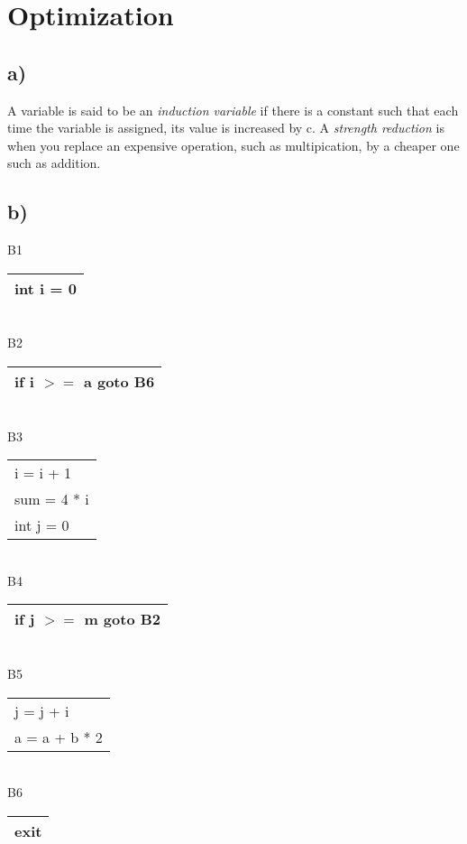 \section{Optimization}
\subsection*{a)}
A variable is said to be an \emph{induction variable} if there is a constant such that each time the variable is assigned, its value is increased by c. A \emph{strength reduction} is when you replace an expensive operation, such as multipication, by a cheaper one such as addition. 
\subsection*{b)}
B1\begin{tabular}{|l|}
\hline
int i = 0	\\
\hline
\end{tabular}	\\
B2\begin{tabular}{|l|}
\hline
if i $>=$ a goto B6	\\
\hline
\end{tabular}	\\
B3\begin{tabular}{|l|}
\hline
i = i + 1	\\
sum = 4 * i	\\
int j = 0	\\
\hline
\end{tabular}	\\
B4\begin{tabular}{|l|}
\hline
if j $>=$ m goto B2	\\
\hline
\end{tabular}	\\
B5\begin{tabular}{|l|}
\hline
j = j + i	\\
a = a + b * 2	\\
\hline
\end{tabular}	\\
B6\begin{tabular}{|l|}
\hline
exit	\\
\hline
\end{tabular}	\\

